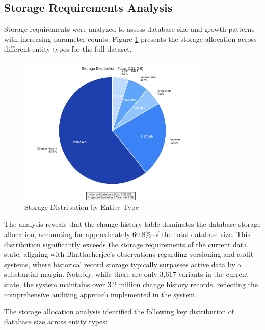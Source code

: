 \subsection{Storage Requirements Analysis}
\label{subsec:storage-requirements-analysis}

Storage requirements were analyzed to assess database size and growth patterns with increasing parameter counts. Figure \ref{fig:storage-analysis} presents the storage allocation across different entity types for the full dataset.

\begin{figure}[h]
    \centering
    \includegraphics[width=0.8\textwidth]{figures/storage_distribution.png}
    \caption{Storage Distribution by Entity Type}
    \label{fig:storage-analysis}
\end{figure}

The analysis reveals that the change history table dominates the database storage allocation, accounting for approximately 60.8\% of the total database size. This distribution significantly exceeds the storage requirements of the current data state, aligning with Bhattacherjee's observations \cite{bhattacherjee2015principles} regarding versioning and audit systems, where historical record storage typically surpasses active data by a substantial margin. Notably, while there are only 3,617 variants in the current state, the system maintains over 3.2 million change history records, reflecting the comprehensive auditing approach implemented in the system.

The storage allocation analysis identified the following key distribution of database size across entity types:

